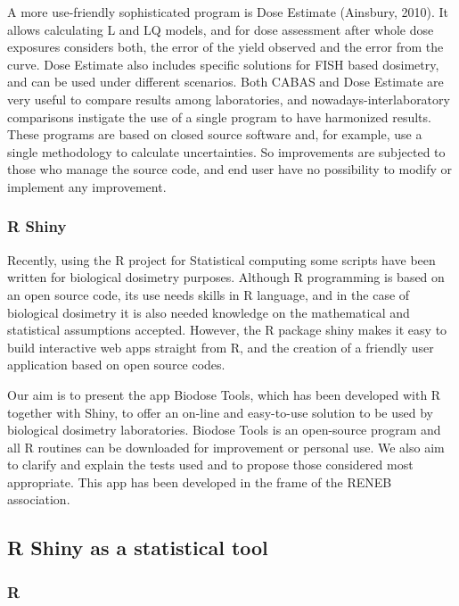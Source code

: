 \documentclass[]{scrartcl}
\begin{document}
A more use-friendly sophisticated program is Dose Estimate (Ainsbury, 2010). It allows calculating L and LQ models, and for dose assessment after whole dose exposures considers both, the error of the yield observed and the error from the curve. Dose Estimate also includes specific solutions for FISH based dosimetry, and can be used under different scenarios. Both CABAS and Dose Estimate are very useful to compare results among laboratories, and nowadays-interlaboratory comparisons instigate the use of a single program to have harmonized results. These programs are based on closed source software and, for example, use a single methodology to calculate uncertainties. So improvements are subjected to those who manage the source code, and end user have no possibility to modify or implement any improvement.

\hypertarget{r-shiny}{%
\subsubsection{R Shiny}\label{r-shiny}}

Recently, using the R project for Statistical computing \citep{R-base} some scripts have been written for biological dosimetry purposes. Although R programming is based on an open source code, its use needs skills in R language, and in the case of biological dosimetry it is also needed knowledge on the mathematical and statistical assumptions accepted. However, the R package shiny makes it easy to build interactive web apps straight from R, and the creation of a friendly user application based on open source codes.

Our aim is to present the app Biodose Tools, which has been developed with R together with Shiny, to offer an on-line and easy-to-use solution to be used by biological dosimetry laboratories. Biodose Tools is an open-source program and all R routines can be downloaded for improvement or personal use. We also aim to clarify and explain the tests used and to propose those considered most appropriate. This app has been developed in the frame of the RENEB association.

\hypertarget{intro-rlang}{%
\subsection{R Shiny as a statistical tool}\label{intro-rlang}}

\hypertarget{r}{%
\subsubsection{R}\label{r}}
\end{document}
